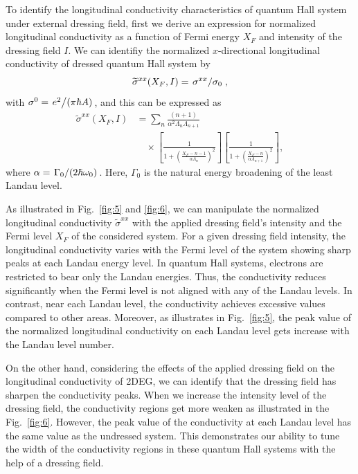 
To identify the longitudinal conductivity characteristics of quantum Hall system under external dressing field, first we derive an expression for normalized longitudinal conductivity as a function of Fermi energy $X_F$ and intensity of the dressing field $I$.
We can identifiy the normalized $x$-directional longitudinal conductivity of dressed quantum Hall system by
\begin{equation}\label{eq:37}
  \widetilde{\sigma}^{xx}(X_F,I) =
  \flatfrac{\sigma^{xx}}{\sigma_{0}},
\end{equation}
with $\sigma^0 = \flatfrac{e^2}{(\pi \hbar A)}$, and this can be expressed as
\begin{equation} \label{eq:38}
  \begin{aligned}
    \widetilde{\sigma}^{xx}(X_F,I) &=
    \sum_{n}
    \frac{(n+1)}{\alpha^2 \Lambda_n \Lambda_{n+1}} \\
    &\quad\times
    \left[
      \frac{1}
      {
        1 + \left(\frac{X_F - n -1}{\alpha \Lambda_n}\right)^2
      }
    \right]
    \left[
      \frac{1}
      {
        1 + \left(\frac{X_F - n}{\alpha \Lambda_{n+1}}\right)^2
      }
    \right],
  \end{aligned}
\end{equation}
where $\alpha = \flatfrac{\Gamma_0}{(2\hbar \omega_0)}$. Here, $\Gamma_0$ is the natural energy broadening of the least Landau level.

As illustrated in Fig.~\ref{fig:5} and \ref{fig:6}, we can manipulate the normalized longitudinal conductivity $\widetilde{\sigma}^{xx}$ with the applied dressing field's intensity and the Fermi level $X_F$ of the considered system.
For a given dressing field intensity, the longitudinal conductivity varies with  the Fermi level of the system showing sharp peaks at each Landau energy level.
In quantum Hall systems, electrons are restricted to bear only the Landau energies. Thus, the conductivity reduces significantly when the Fermi level is not aligned with any of the Landau levels. In contrast, near each Landau level, the conductivity achieves excessive values compared to other areas. Moreover, as illustrates in Fig.~\ref{fig:5}, the peak value of the normalized longitudinal conductivity on each Landau level gets increase with the Landau level number.

On the other hand, considering the effects of the applied dressing field on the longitudinal conductivity of 2DEG, we can identify that the dressing field has sharpen the conductivity peaks.
When we increase the intensity level of the dressing field, the conductivity regions get more weaken as illustrated in the Fig.~\ref{fig:6}.
However, the peak value of the conductivity at each Landau level has the same value as the undressed system. This demonstrates our ability to tune the width of the conductivity regions in these quantum Hall systems with the help of a dressing field.

